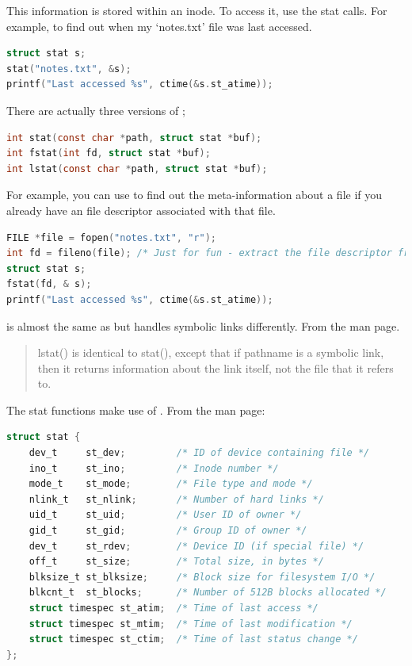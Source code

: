 This information is stored within an inode.
To access it, use the stat calls.
For example, to find out when my `notes.txt' file was last accessed.

\begin{lstlisting}[language=C]
struct stat s;
stat("notes.txt", &s);
printf("Last accessed %s", ctime(&s.st_atime));
\end{lstlisting}

There are actually three versions of ;

\begin{lstlisting}[language=C]
int stat(const char *path, struct stat *buf);
int fstat(int fd, struct stat *buf);
int lstat(const char *path, struct stat *buf);
\end{lstlisting}

For example, you can use  to find out the meta-information about a file if you already have an file descriptor associated with that file.

\begin{lstlisting}[language=C]
FILE *file = fopen("notes.txt", "r");
int fd = fileno(file); /* Just for fun - extract the file descriptor from a C FILE struct */
struct stat s;
fstat(fd, & s);
printf("Last accessed %s", ctime(&s.st_atime));
\end{lstlisting}

 is almost the same as  but handles symbolic links differently. From the  man page.

\begin{quote}
lstat() is identical to stat(), except that if pathname is a symbolic link, then it returns information about the link itself, not the file that it refers to.
\end{quote}

The stat functions make use of . From the  man page:

\begin{lstlisting}[language=C]
struct stat {
    dev_t     st_dev;         /* ID of device containing file */
    ino_t     st_ino;         /* Inode number */
    mode_t    st_mode;        /* File type and mode */
    nlink_t   st_nlink;       /* Number of hard links */
    uid_t     st_uid;         /* User ID of owner */
    gid_t     st_gid;         /* Group ID of owner */
    dev_t     st_rdev;        /* Device ID (if special file) */
    off_t     st_size;        /* Total size, in bytes */
    blksize_t st_blksize;     /* Block size for filesystem I/O */
    blkcnt_t  st_blocks;      /* Number of 512B blocks allocated */
    struct timespec st_atim;  /* Time of last access */
    struct timespec st_mtim;  /* Time of last modification */
    struct timespec st_ctim;  /* Time of last status change */
};
\end{lstlisting}

